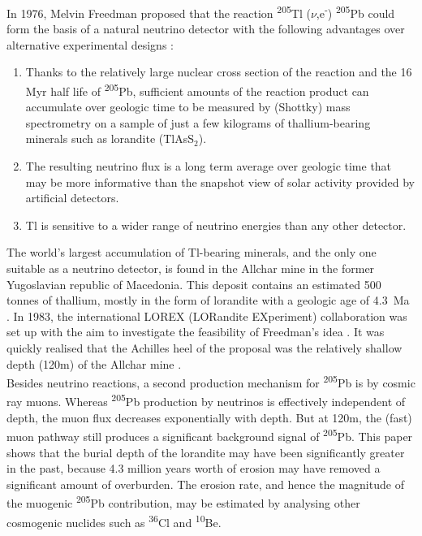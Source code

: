 \documentclass[titlepage]{article}
\begin{document}
In 1976, Melvin Freedman proposed that the reaction
\textsuperscript{205}Tl ($\nu$,e\textsuperscript{-})
\textsuperscript{205}Pb could form the basis of a natural neutrino
detector with the following advantages over alternative experimental
designs \citep{freedman1976}:

\begin{enumerate}
\item Thanks to the relatively large nuclear cross section of the
  reaction and the 16 Myr half life of \textsuperscript{205}Pb,
  sufficient amounts of the reaction product can accumulate over
  geologic time to be measured by (Shottky) mass spectrometry on a
  sample of just a few kilograms of thallium-bearing minerals such as
  lorandite (TlAsS$_{2}$).
\item The resulting neutrino flux is a long term average over geologic
  time that may be more informative than the snapshot view of solar
  activity provided by artificial detectors.
\item Tl is sensitive to a wider range of neutrino energies than any
  other detector.
\end{enumerate}
    
The world's largest accumulation of Tl-bearing minerals, and the only
one suitable as a neutrino detector, is found in the Allchar mine in
the former Yugoslavian republic of Macedonia. This deposit contains an
estimated 500 tonnes of thallium, mostly in the form of lorandite with
a geologic age of 4.3~Ma \citep{neubauer2009}. In 1983, the
international LOREX (LORandite EXperiment) collaboration was set up
with the aim to investigate the feasibility of Freedman's idea
\citep{pavicevic1988}. It was quickly realised that the Achilles heel
of the proposal was the relatively shallow depth (120m) of the Allchar
mine \citep{neumaier1991}.\\

Besides neutrino reactions, a second production mechanism for
\textsuperscript{205}Pb is by cosmic ray muons. Whereas
\textsuperscript{205}Pb production by neutrinos is effectively
independent of depth, the muon flux decreases exponentially with
depth. But at 120m, the (fast) muon pathway still produces a
significant background signal of \textsuperscript{205}Pb. This paper
shows that the burial depth of the lorandite may have been
significantly greater in the past, because 4.3 million years worth of
erosion may have removed a significant amount of overburden. The
erosion rate, and hence the magnitude of the muogenic
\textsuperscript{205}Pb contribution, may be estimated by analysing
other cosmogenic nuclides such as \textsuperscript{36}Cl and
\textsuperscript{10}Be.\\
\end{document}
